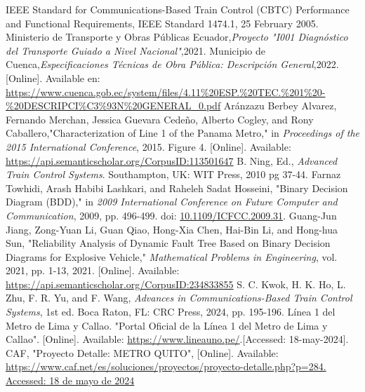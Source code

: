 \documentclass[conference]{IEEEtran}
\begin{document}

\begin{thebibliography}{00}
IEEE Standard for Communications-Based Train Control (CBTC) Performance and Functional Requirements, IEEE Standard 1474.1, 25 February 2005.
Ministerio de Transporte y Obras Públicas Ecuador,\textit{Proyecto "I001 Diagnóstico del Transporte Guiado a Nivel Nacional"},2021.
Municipio de Cuenca,\textit{Especificaciones Técnicas de Obra Pública: Descripción General},2022.[Online]. Available en: \url{https://www.cuenca.gob.ec/system/files/4.11%20ESP.%20TEC.%201%20-%20DESCRIPCI%C3%93N%20GENERAL_0.pdf}
Ar{\'a}nzazu Berbey Alvarez, Fernando Merchan, Jessica Guevara Cede{\~n}o, Alberto Cogley, and Rony Caballero,"Characterization of Line 1 of the Panama Metro," in \textit{Proceedings of the 2015 International Conference}, 2015. Figure 4. [Online]. Available: \href{https://api.semanticscholar.org/CorpusID:113501647}{https://api.semanticscholar.org/CorpusID:113501647}
 B. Ning, Ed., \emph{Advanced Train Control Systems}. Southampton, UK: WIT Press, 2010 pg 37-44.
Farnaz Towhidi, Arash Habibi Lashkari, and Raheleh Sadat Hosseini, "Binary Decision Diagram (BDD)," in \textit{2009 International Conference on Future Computer and Communication}, 2009, pp. 496-499. doi: \href{https://doi.org/10.1109/ICFCC.2009.31}{10.1109/ICFCC.2009.31}.
Guang-Jun Jiang, Zong-Yuan Li, Guan Qiao, Hong-Xia Chen, Hai-Bin Li, and Hong-hua Sun, "Reliability Analysis of Dynamic Fault Tree Based on Binary Decision Diagrams for Explosive Vehicle," \textit{Mathematical Problems in Engineering}, vol. 2021, pp. 1-13, 2021. [Online]. Available: \url{https://api.semanticscholar.org/CorpusID:234833855}
 S. C. Kwok, H. K. Ho, L. Zhu, F. R. Yu, and F. Wang, \textit{Advances in Communications-Based Train Control Systems}, 1st ed. Boca Raton, FL: CRC Press, 2024, pp. 195-196.
Línea 1 del Metro de Lima y Callao. "Portal Oficial de la Línea 1 del Metro de Lima y Callao". [Online].  Available: \url{https://www.lineauno.pe/}.[Accessed: 18-may-2024].
CAF, "Proyecto Detalle: METRO QUITO", [Online]. Available: \url{https://www.caf.net/es/soluciones/proyectos/proyecto-detalle.php?p=284. Accessed: 18 de mayo de 2024}

\end{thebibliography}
\end{document}
